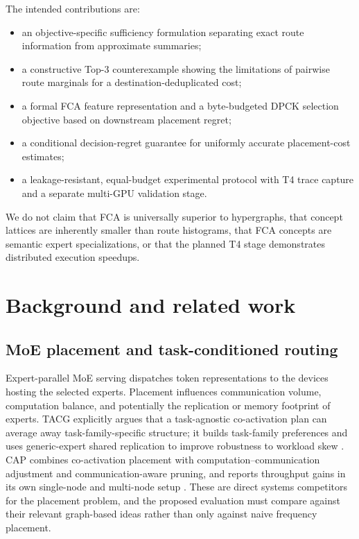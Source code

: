 \documentclass[a4paper,preprint,review,12pt,authoryear]{elsarticle}
\begin{document}
The intended contributions are:
\begin{itemize}[leftmargin=*]
  \item an objective-specific sufficiency formulation separating exact route information from approximate summaries;
  \item a constructive Top-3 counterexample showing the limitations of pairwise route marginals for a destination-deduplicated cost;
  \item a formal FCA feature representation and a byte-budgeted DPCK selection objective based on downstream placement regret;
  \item a conditional decision-regret guarantee for uniformly accurate placement-cost estimates;
  \item a leakage-resistant, equal-budget experimental protocol with T4 trace capture and a separate multi-GPU validation stage.
\end{itemize}

We do not claim that FCA is universally superior to hypergraphs, that concept lattices are inherently smaller than route histograms, that FCA concepts are semantic expert specializations, or that the planned T4 stage demonstrates distributed execution speedups.

\section{Background and related work}
\label{sec:related}

\subsection{MoE placement and task-conditioned routing}

Expert-parallel MoE serving dispatches token representations to the devices hosting the selected experts. Placement influences communication volume, computation balance, and potentially the replication or memory footprint of experts. TACG explicitly argues that a task-agnostic co-activation plan can average away task-family-specific structure; it builds task-family preferences and uses generic-expert shared replication to improve robustness to workload skew \citep{xu2026tacg}. CAP combines co-activation placement with computation--communication adjustment and communication-aware pruning, and reports throughput gains in its own single-node and multi-node setup \citep{shi2026cap}. These are direct systems competitors for the placement problem, and the proposed evaluation must compare against their relevant graph-based ideas rather than only against naive frequency placement.
\end{document}
